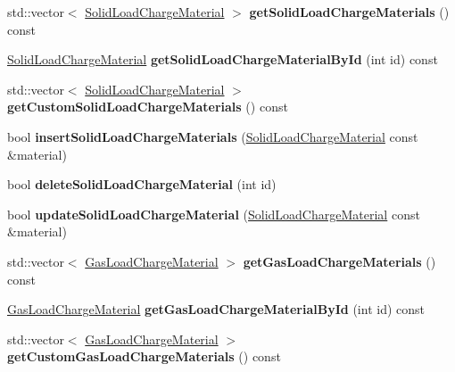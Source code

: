 \begin{DoxyCompactItemize}
std\+::vector$<$ \hyperlink{class_solid_load_charge_material}{Solid\+Load\+Charge\+Material} $>$ {\bfseries get\+Solid\+Load\+Charge\+Materials} () const
\item 
\mbox{\label{class_s_q_lite_ab2a00b913321a96a4d7b700627195616}} 
\hyperlink{class_solid_load_charge_material}{Solid\+Load\+Charge\+Material} {\bfseries get\+Solid\+Load\+Charge\+Material\+By\+Id} (int id) const
\item 
\mbox{\label{class_s_q_lite_a868c571d80d43a991762ec20c168ebb2}} 
std\+::vector$<$ \hyperlink{class_solid_load_charge_material}{Solid\+Load\+Charge\+Material} $>$ {\bfseries get\+Custom\+Solid\+Load\+Charge\+Materials} () const
\item 
\mbox{\label{class_s_q_lite_a5c40ac3b9a6abb85c9cfbe50802672c5}} 
bool {\bfseries insert\+Solid\+Load\+Charge\+Materials} (\hyperlink{class_solid_load_charge_material}{Solid\+Load\+Charge\+Material} const \&material)
\item 
\mbox{\label{class_s_q_lite_a0a240c89a1e0c96ef61c3beae68b1467}} 
bool {\bfseries delete\+Solid\+Load\+Charge\+Material} (int id)
\item 
\mbox{\label{class_s_q_lite_ac2c7142caa0154783f7ed73afa4bd6db}} 
bool {\bfseries update\+Solid\+Load\+Charge\+Material} (\hyperlink{class_solid_load_charge_material}{Solid\+Load\+Charge\+Material} const \&material)
\item 
\mbox{\label{class_s_q_lite_accd7e97b19298b75eabc3a2b4bbc9b1c}} 
std\+::vector$<$ \hyperlink{class_gas_load_charge_material}{Gas\+Load\+Charge\+Material} $>$ {\bfseries get\+Gas\+Load\+Charge\+Materials} () const
\item 
\mbox{\label{class_s_q_lite_ab89ac4049cbedcb6340f5d7d0139b89e}} 
\hyperlink{class_gas_load_charge_material}{Gas\+Load\+Charge\+Material} {\bfseries get\+Gas\+Load\+Charge\+Material\+By\+Id} (int id) const
\item 
\mbox{\label{class_s_q_lite_a1957d2f9ac35433b45e8511aa6889756}} 
std\+::vector$<$ \hyperlink{class_gas_load_charge_material}{Gas\+Load\+Charge\+Material} $>$ {\bfseries get\+Custom\+Gas\+Load\+Charge\+Materials} () const

\end{DoxyCompactItemize}
